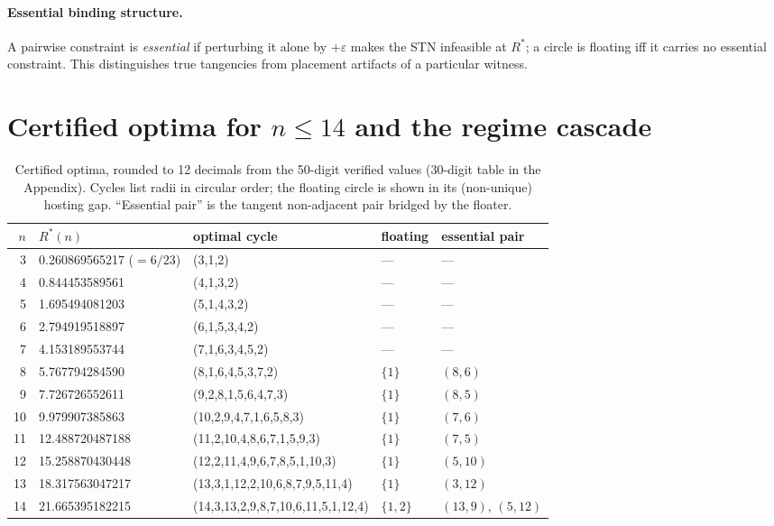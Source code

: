 \documentclass[11pt]{article}
\theoremstyle{definition}
\theoremstyle{remark}
\begin{document}
\paragraph{Essential binding structure.} A pairwise constraint is \emph{essential} if perturbing it alone by $+\varepsilon$ makes the STN infeasible at $R^\ast$; a circle is floating iff it carries no essential constraint. This distinguishes true tangencies from placement artifacts of a particular witness.

\section{Certified optima for \texorpdfstring{$n\le 14$}{n <= 14} and the regime cascade}\label{sec:results}

\begin{table}[ht]\centering
\caption{Certified optima, rounded to 12 decimals from the 50-digit verified values (30-digit table in the Appendix). Cycles list radii in circular order; the floating circle is shown in its (non-unique) hosting gap. ``Essential pair'' is the tangent non-adjacent pair bridged by the floater.}
\label{tab:main}
\small
\begin{tabular}{rllll}
\toprule
$n$ & $R^\ast(n)$ & optimal cycle & floating & essential pair \\
\midrule
3 & 0.260869565217 ($=6/23$) & (3,1,2) & --- & --- \\
4 & 0.844453589561 & (4,1,3,2) & --- & --- \\
5 & 1.695494081203 & (5,1,4,3,2) & --- & --- \\
6 & 2.794919518897 & (6,1,5,3,4,2) & --- & --- \\
7 & 4.153189553744 & (7,1,6,3,4,5,2) & --- & --- \\
8 & 5.767794284590 & (8,1,6,4,5,3,7,2) & $\{1\}$ & $(8,6)$ \\
9 & 7.726726552611 & (9,2,8,1,5,6,4,7,3) & $\{1\}$ & $(8,5)$ \\
10 & 9.979907385863 & (10,2,9,4,7,1,6,5,8,3) & $\{1\}$ & $(7,6)$ \\
11 & 12.488720487188 & (11,2,10,4,8,6,7,1,5,9,3) & $\{1\}$ & $(7,5)$ \\
12 & 15.258870430448 & (12,2,11,4,9,6,7,8,5,1,10,3) & $\{1\}$ & $(5,10)$ \\
13 & 18.317563047217 & (13,3,1,12,2,10,6,8,7,9,5,11,4) & $\{1\}$ & $(3,12)$ \\
14 & 21.665395182215 & (14,3,13,2,9,8,7,10,6,11,5,1,12,4) & $\{1,2\}$ & $(13,9),\,(5,12)$ \\
\bottomrule
\end{tabular}
\end{table}
\end{document}
